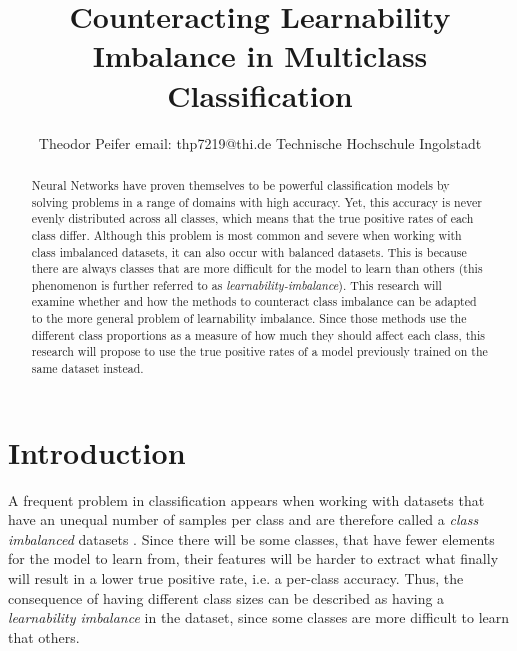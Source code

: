 \documentclass[journal]{IEEEtran}
\begin{document}
 

\title{\textbf{Counteracting Learnability Imbalance in Multiclass Classification}}

\author{Theodor Peifer
        \linebreak
        email: thp7219@thi.de
        \linebreak
        Technische Hochschule Ingolstadt
}

\maketitle

\begin{abstract}
Neural Networks have proven themselves to be powerful classification
models by solving problems in a range of domains with high accuracy.
Yet, this accuracy is never evenly distributed across all classes, which means that the true positive rates of each class differ.
Although this problem is most common and severe when working with class imbalanced datasets, it can also occur with balanced datasets.
This is because there are always classes that are more difficult for the model to learn than others (this phenomenon is further referred to as \emph{learnability-imbalance}).
This research will examine whether and how the methods to counteract class imbalance can be adapted to the more general problem of learnability imbalance.
Since those methods use the different class proportions as a measure of how much they should affect each class, this research will propose
to use the true positive rates of a model previously trained on the same dataset instead.

\end{abstract}


\section{Introduction}
A frequent problem in classification appears when working with datasets that have an unequal number of samples per class and are therefore called a \emph{class imbalanced} datasets \cite{japkowicz2002class}.
Since there will be some classes, that have fewer elements for the model to learn from, their features will be harder to extract what finally will result in a lower true positive rate, i.e. a per-class accuracy.
Thus, the consequence of having different class sizes can be described as having a \emph{learnability imbalance} in the dataset, since some classes are more difficult to learn that others.
\end{document}
